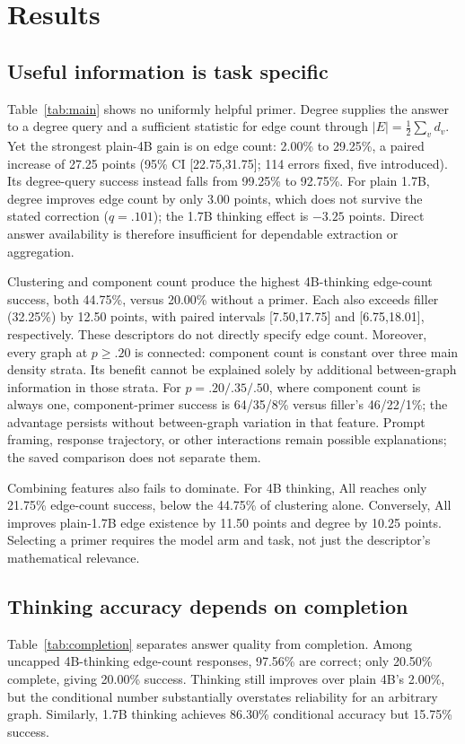 \documentclass[11pt]{article}
\begin{document}
\section{Results}
\subsection{Useful information is task specific}
Table~\ref{tab:main} shows no uniformly helpful primer. Degree supplies the answer to a degree query and a sufficient statistic for edge count through $|E|=\tfrac12\sum_v d_v$. Yet the strongest plain-4B gain is on edge count: 2.00\% to 29.25\%, a paired increase of 27.25 points (95\% CI [22.75,31.75]; 114 errors fixed, five introduced). Its degree-query success instead falls from 99.25\% to 92.75\%. For plain 1.7B, degree improves edge count by only 3.00 points, which does not survive the stated correction ($q=.101$); the 1.7B thinking effect is $-3.25$ points. Direct answer availability is therefore insufficient for dependable extraction or aggregation.

Clustering and component count produce the highest 4B-thinking edge-count success, both 44.75\%, versus 20.00\% without a primer. Each also exceeds filler (32.25\%) by 12.50 points, with paired intervals [7.50,17.75] and [6.75,18.01], respectively. These descriptors do not directly specify edge count. Moreover, every graph at $p\geq.20$ is connected: component count is constant over three main density strata. Its benefit cannot be explained solely by additional between-graph information in those strata. For $p=.20/.35/.50$, where component count is always one, component-primer success is 64/35/8\% versus filler's 46/22/1\%; the advantage persists without between-graph variation in that feature. Prompt framing, response trajectory, or other interactions remain possible explanations; the saved comparison does not separate them.

Combining features also fails to dominate. For 4B thinking, All reaches only 21.75\% edge-count success, below the 44.75\% of clustering alone. Conversely, All improves plain-1.7B edge existence by 11.50 points and degree by 10.25 points. Selecting a primer requires the model arm and task, not just the descriptor's mathematical relevance.

\subsection{Thinking accuracy depends on completion}
\begin{table}[t]
\centering\small

\caption{No-primer edge counting ($n=400$). Completion, accuracy conditional on completion, and unconditional success (all \%). Their product, after converting to proportions, gives success.}
\label{tab:completion}
\end{table}
Table~\ref{tab:completion} separates answer quality from completion. Among uncapped 4B-thinking edge-count responses, 97.56\% are correct; only 20.50\% complete, giving 20.00\% success. Thinking still improves over plain 4B's 2.00\%, but the conditional number substantially overstates reliability for an arbitrary graph. Similarly, 1.7B thinking achieves 86.30\% conditional accuracy but 15.75\% success.
\end{document}
